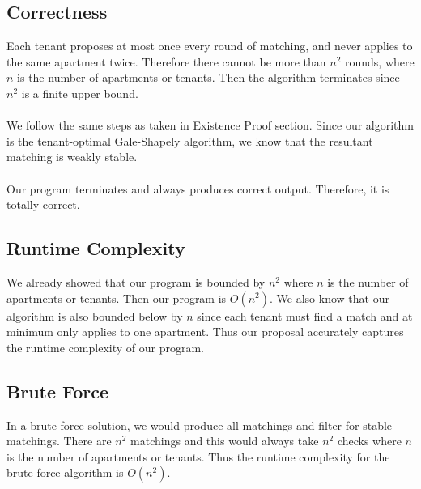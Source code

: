 \documentclass{article}
\begin{document}
\subsection{Correctness}
Each tenant proposes at most once every round of matching, and never applies
to the same apartment twice. Therefore there cannot be more than $n^2$ rounds,
where $n$ is the number of apartments or tenants. Then the algorithm
terminates since $n^2$ is a finite upper bound.
\\\\
We follow the same steps as taken in Existence Proof section. Since our
algorithm is the tenant-optimal Gale-Shapely algorithm, we know that the
resultant matching is weakly stable.
\\\\
Our program terminates and always produces correct output. Therefore, it is 
totally correct.


\subsection{Runtime Complexity}
We already showed that our program is bounded by $n^2$ where $n$ is the number
of apartments or tenants. Then our program is $O(n^2)$. We also know that our
algorithm is also bounded below by $n$ since each tenant must find a match and
at minimum only applies to one apartment. Thus our proposal accurately
captures the runtime complexity of our program.

\subsection{Brute Force}
In a brute force solution, we would produce all matchings and filter for
stable matchings. There are $n^2$ matchings and this would always take
$n^2$ checks where $n$ is the number of apartments or tenants. Thus the
runtime complexity for the brute force algorithm is $O(n^2)$.
\end{document}
